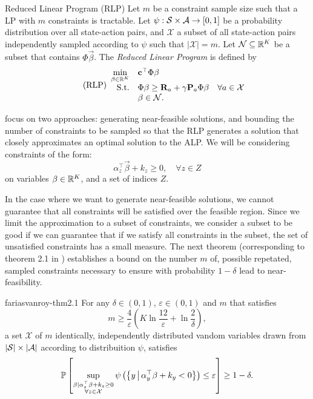 \begin{dfn}{Reduced Linear Program (RLP)}{}
    Let $m$ be a constraint sample size such that a LP with $m$ constraints is
    tractable. Let $\psi: \mathcal{S} \times \mathcal{A} \to [0, 1]$ be a probability
    distribution over all state-action pairs, and $\mathcal{X}$ a subset of all
    state-action pairs independently sampled according to $\psi$ such that
    $|\mathcal{X}| = m$. Let $\mathcal{N} \subseteq \mathbb{R}^K$ be a subset that
    contains $\Phi\vec{\beta}$.  The \emph{Reduced Linear Program} is defined by
    \begin{equation}
        \label{lp:reduced-lp}
        \tag{RLP}
        \begin{array}{rl@{}ll}
            \displaystyle \min_{\vec{\beta} \in \R^{K}} & \vec{c}^{\top} \Phi \vec{\beta} \\
            \text{S.t.} & \displaystyle \Phi \vec{\beta} \geq \vec{R}_a + \gamma \vec{P}_a \Phi \vec{\beta} & \quad \forall a \in \mathcal{X} \\
            & \vec{\beta} \in \mathcal{N}.
        \end{array}
    \end{equation}
\end{dfn}

\citeauthor{farias2004constraint} focus on two approaches: generating
near-feasible solutions, and bounding the number of constraints to be sampled so
that the RLP generates a solution that closely approximates an optimal solution
to the ALP. We will be considering constraints of the form:
\[
    \alpha_{z}^{\top} \vec{\beta} + k_z \geq 0, \quad \forall z \in Z
\]
on variables $\mathbf{\beta} \in \mathbb{R}^{K}$, and a set of indices $Z$.

In the case where we want to generate near-feasible solutions, we cannot
guarantee that all constraints will be satisfied over the feasible region. Since
we limit the approximation to a subset of constraints, we consider a subset to
be good if we can guarantee that if we satisfy all constraints in the subset,
the set of unsatisfied constraints has a small measure. The next theorem
(corresponding to theorem 2.1 in \cite[pg.~467]{farias2004constraint})
establishes a bound on the number $m$ of, possible repetated, sampled
constraints necessary to ensure with probability $1 - \delta$ lead to
near-feasibility.

\begin{thrm}{}{fariasvanroy-thm2.1}
    For any $\delta \in (0,1)$, $\varepsilon \in (0,1)$ and $m$ that satisfies
    \[
        m \geq \frac{4}{\varepsilon} \left( K \ln \frac{12}{\varepsilon} + \ln \frac{2}{\delta} \right),
    \]
    a set $\mathcal{X}$ of $m$ identically, independently distributed vandom
    variables drawn from $|\mathcal{S}| \times |\mathcal{A}|$ according to
    distribuition $\psi$, satisfies 
    \[
        \mathbb{P}\left[
            \sup_{\substack{\mathbf{\beta} \mid \alpha_{z}^{\top} \mathbf{\beta} + k_{z} \geq 0  \\ \forall z \in \mathcal{X} }}
            \psi \left( \left\{ y \,\middle\vert\, \alpha_{y}^{\top} \mathbf{\beta} + k_y  < 0 \right\} \right) \leq \varepsilon
        \right] \geq 1 - \delta.
    \]
\end{thrm}

